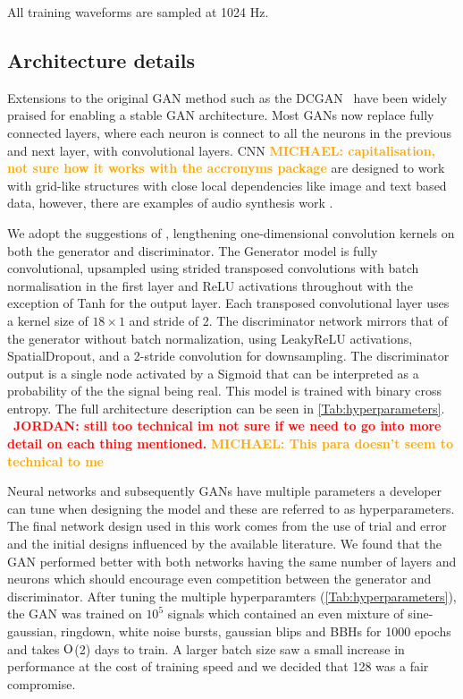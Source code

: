 \documentclass[12pt]{iopart}
\newcommand{\jordan}[1]{\textbf{\textcolor{red}{JORDAN: #1}}}
\newcommand{\chris}[1]{\textbf{\textcolor{green}{CHRIS: #1}}}
\newcommand{\michael}[1]{\textbf{\textcolor{orange}{MICHAEL: #1}}}
\begin{document}
All training waveforms are sampled at 1024 Hz.

\subsection{Architecture details}

%
Extensions to the original \ac{GAN} method such as the
\ac{DCGAN}~\cite{Radford2015} have been widely praised for
enabling a stable \ac{GAN} architecture. Most GANs now replace fully connected layers, where each neuron is connect to all the neurons in the previous and next layer, with convolutional layers. \ac{CNN} \michael{capitalisation, not sure how it works with the accronyms package} are designed to work with grid-like structures with close local dependencies like image and text based data, however, there are examples of audio synthesis work \cite{DBLP:journals/corr/abs-1809-11096}.

%
We adopt the suggestions of \cite{Radford2015,DBLP:journals/corr/abs-1809-11096}, lengthening
one-dimensional convolution kernels on both the generator and discriminator.
The Generator model is fully convolutional, upsampled using strided transposed
convolutions with batch normalisation in the first layer and ReLU activations
throughout with the exception of Tanh for the output layer. Each transposed
convolutional layer uses a kernel size of $18\times 1$ and stride of 2. The
discriminator network mirrors that of the generator without batch
normalization, using LeakyReLU activations, SpatialDropout, and a 2-stride
convolution for downsampling. The discriminator output is a single node activated by a Sigmoid that can be interpreted as
a probability of the the signal being real. This model is trained
with binary cross entropy. The full architecture description can be seen in \cref{Tab:hyperparameters}. ~\jordan{still too technical im not sure if we need to go into more detail on each thing mentioned.} \michael{This para doesn't seem to technical to me}

%
Neural networks and subsequently \acp{GAN} have multiple parameters a developer
can tune when designing the model and these are referred to as hyperparameters.
The final network design used in this work comes from the use of trial and
error and the initial designs influenced by the available literature. We found that the GAN performed better with both networks having the same number of layers and neurons which should encourage even competition between the generator and discriminator.  After
tuning the multiple hyperparamters (\cref{Tab:hyperparameters}), the GAN
was trained on $10^5$ signals which contained an even mixture of sine-gaussian, ringdown, white noise bursts, gaussian blips and BBHs for 1000 epochs and takes $\mathord{\mathrm{O}}$(2) days to train. A larger batch size saw a small increase in performance at the cost of training speed and we decided that 128 was a fair compromise. 
\end{document}
